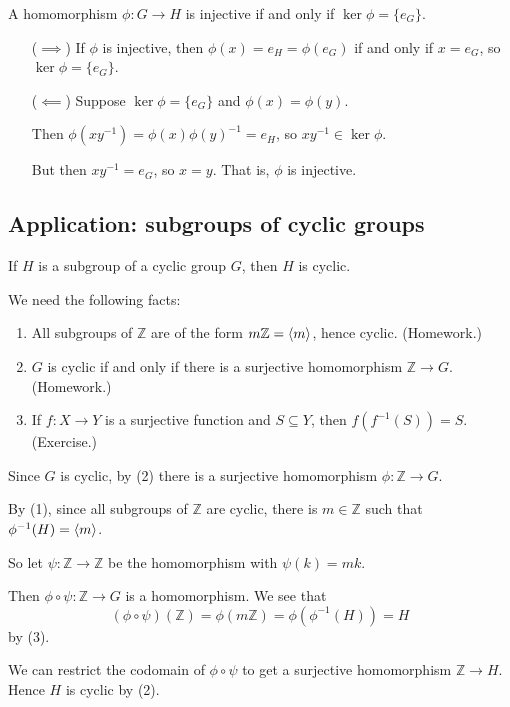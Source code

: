\documentclass[12pt,letterpaper]{report}
\begin{document}
\begin{prop}{}{}
  A homomorphism $\phi \colon G \to H$ is injective if and only if $\ker \phi = \{e_G\}$.
\end{prop}

\begin{thmproof}
  \begin{enumerate}[leftmargin=4em]
    \item[($\implies$)]
    If $\phi$ is injective, then $\phi(x) = e_H = \phi(e_G)$ if and only if $x = e_G$, so
    $\ker \phi = \{e_G\}$.
    \item[($\impliedby$)]
    Suppose $\ker \phi = \{e_G\}$ and $\phi(x) = \phi(y)$.

    Then $\phi(xy^{-1}) = \phi(x)\phi(y)^{-1} = e_H$, so $xy^{-1} \in \ker \phi$.

    But then $xy^{-1} = e_G$, so $x = y$.
    That is, $\phi$ is injective.
  \end{enumerate}
\end{thmproof}

\pagebreak
\subsection{Application: subgroups of cyclic groups}

\begin{prop}{}{}
  If $H$ is a subgroup of a cyclic group $G$, then $H$ is cyclic.
\end{prop}

\begin{thmproof}
  We need the following facts:
  \begin{enumerate}
    \item All subgroups of $\mathbb{Z}$ are of the form $m\mathbb{Z} = \langle m\rangle$, hence cyclic.
    (Homework.)
    \item $G$ is cyclic if and only if there is a surjective homomorphism $\mathbb{Z} \to G$.
    (Homework.)
    \item If $f \colon X \to Y$ is a surjective function and $S \subseteq Y$, then
    $f(f^{-1}(S)) = S$.
    (Exercise.)
  \end{enumerate}

  Since $G$ is cyclic, by (2) there is a surjective homomorphism $\phi \colon \mathbb{Z} \to G$.

  By (1), since all subgroups of $\mathbb{Z}$ are cyclic, there is $m \in \mathbb{Z}$ such that
  $\phi^{-1}(H) = \langle m\rangle$.

  So let $\psi \colon \mathbb{Z} \to \mathbb{Z}$ be the homomorphism with $\psi(k) = mk$.

  Then $\phi \circ \psi \colon \mathbb{Z} \to G$ is a homomorphism.
  We see that
  \[ (\phi \circ \psi)(\mathbb{Z}) = \phi(m\mathbb{Z}) = \phi(\phi^{-1}(H)) = H \]
  by (3).

  We can restrict the codomain of $\phi \circ \psi$ to get a surjective homomorphism
  $\mathbb{Z} \to H$.
  Hence $H$ is cyclic by (2).
\end{thmproof}
\end{document}
